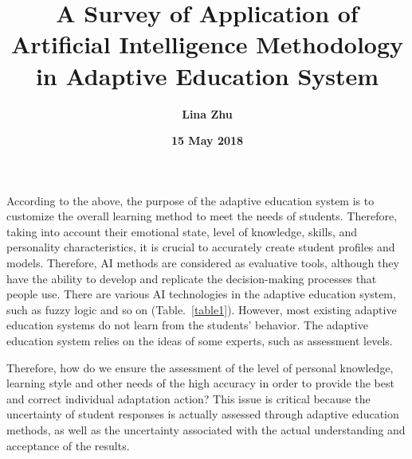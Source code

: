 \documentclass[a4paper,12pt,twocolumn]{article}
\begin{document}
	
\title{\textbf{\bfseries \LARGE A Survey of Application of Artificial Intelligence Methodology in Adaptive Education System} }
\author{\textbf{Lina Zhu}}
\date{\textbf{15 May 2018}}
\maketitle
	\par 
	According to the above, the purpose of the adaptive education system is to customize the overall learning method to meet the needs of students. Therefore, taking into account their emotional state, level of knowledge, skills, and personality characteristics, it is crucial to accurately create student profiles and models. Therefore, AI methods are considered as evaluative tools, although they have the ability to develop and replicate the decision-making processes that people use. There are various AI technologies in the adaptive education system, such as fuzzy logic and so on (Table.~\ref{table1}). However, most existing adaptive education systems do not learn from the students' behavior. The adaptive education system relies on the ideas of some experts, such as assessment levels.

	
	
	\par Therefore, how do we ensure the assessment of the level of personal knowledge, learning style and other needs of the high accuracy in order to provide the best and correct individual adaptation action? This issue is critical because the uncertainty of student responses is actually assessed through adaptive education methods, as well as the uncertainty associated with the actual understanding and acceptance of the results.
\end{document}
